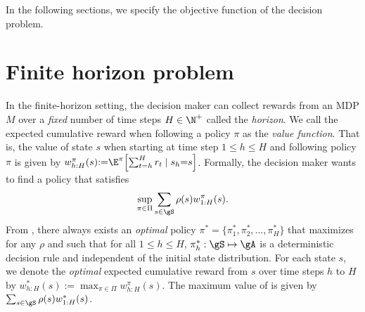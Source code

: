 In the following sections, we specify the objective function of the decision problem.

\section{Finite horizon problem}
\label{ch:mdp:sec:finite}

In the finite-horizon setting, the decision maker can collect rewards from an MDP $M$ over a \emph{fixed} number of time steps $H\in\N^+$ called the \emph{horizon}.
We call the expected cumulative reward when following a policy $\pi$ as the \emph{value function}.
That is, the value of state $s$ when starting at time step $1\le h\le H$ and following policy $\pi$ is given by $w_{h:H}^\pi(s){:=}\E^\pi\Bigl[\sum_{t=h}^H r_t\mid s_h{=}s\Bigr]$.
Formally, the decision maker wants to find a policy that satisfies
\begin{equation}
    \label{eq:finite_obj}
    \sup_{\pi\in\Pi}\sum_{s\in\gS}\rho(s)w_{1:H}^\pi(s).
\end{equation}
From \cite[Chapter~4]{puterman2014markov}, there always exists an \emph{optimal} policy $\pi^*=\{\pi_1^*,\pi_2^*,\dots,\pi^*_H\}$ that maximizes  for any $\rho$ and such that for all $1\le h\le H$, $\pi_h^*:\gS\mapsto\gA$ is a deterministic decision rule and independent of the initial state distribution.
For each state $s$, we denote the \emph{optimal} expected cumulative reward from $s$ over time steps $h$ to $H$ by $w_{h:H}^{*}(s){:=}\max_{\pi\in\Pi}w_{h:H}^\pi(s)$.
The maximum value of  is given by $\sum_{s\in\gS}\rho(s)w_{1:H}^*(s)$.

